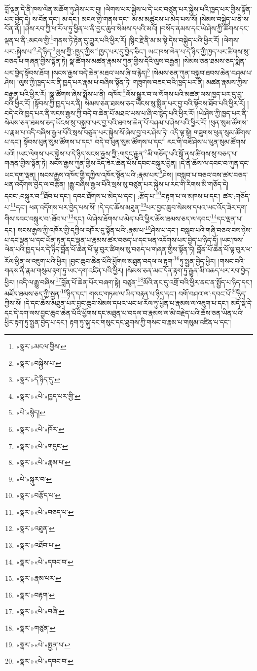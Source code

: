 བློ་ལྡན་དེ་ནི་ཁས་ལེན་མཆོག་ཏུ་ཤེས་པར་བྱ། །ལེགས་པར་སྐྱེས་པ་དེ་ཡང་བཙུན་པར་སྐྱེས་པའི་ཁྱད་པར་གྱིས་སྟོན་པར་བྱེད་དེ། ས་བོན་དང་། མ་དང་། མངལ་གྱི་གནས་དང་། མ་མ་མཚུངས་པ་མེད་པས་སོ། །སེམས་བསྐྱེད་པ་ནི་ས་བོན་ནོ། །ཤེས་རབ་ཀྱི་ཕ་རོལ་ཏུ་ཕྱིན་པ་ནི་བྱང་ཆུབ་སེམས་དཔའི་མའོ། །བསོད་ནམས་དང་ཡེ་ཤེས་ཀྱི་ཚོགས་དང་ལྡན་པ་ནི་:མངལ་གྱི་\footnote{«སྣར་»མངལ་གྱིས་}གནས་ཏེ་རྟེན་དུ་གྱུར་པའི་ཕྱིར་རོ། །སྙིང་རྗེ་ནི་མ་མ་སྟེ་དེས་བསྐྱེད་པའི་ཕྱིར་རོ། །ལེགས་པར་:སྐྱེས་པ་\footnote{«སྣར་»བསྐྱེས་པ་}:དེ་ཉིད་\footnote{«སྣར་»དེ་ཉིད་དུ་}ལུས་ཀྱི་:ཁྱད་ཀྱིས་\footnote{«སྣར་»«པེ་»ཁྱད་པར་གྱི་}ཁྱད་པར་དུ་བྱེད་ཅིང་། ཡང་ཁས་ལེན་པ་དེ་ཉིད་ཀྱི་ཁྱད་པར་ཚིགས་སུ་བཅད་པ་གཞན་གྱིས་སྟོན་ཏེ། སྣ་ཚོགས་མཚན་རྣམས་ཀུན་གྱིས་དེའི་ལུས་བརྒྱན། །སེམས་ཅན་ཐམས་ཅད་སྨིན་པར་བྱེད་སྟོབས་ཐོབ། །སངས་རྒྱས་བདེ་ཆེན་མཐའ་ཡས་ཞི་བ་རྙེད།\footnote{«པེ་»སྙེད།} །སེམས་ཅན་ཀུན་བསྐྱབ་ཐབས་ཆེན་བཤམ་པ་ཤེས། །ལུས་ཀྱི་ཁྱད་པར་ནི་ཁྱད་པར་རྣམ་པ་བཞིས་སྟོན་ཏེ། གཟུགས་བཟང་བའི་ཁྱད་པར་ནི། མཚན་རྣམས་ཀྱིས་བརྒྱན་པའི་ཕྱིར་རོ། །སྣ་ཚོགས་ཞེས་སྨོས་པ་ནི། འཁོར་\footnote{«སྣར་»«པེ་»ཁོར་}ལོས་སྒྱུར་བ་ལ་སོགས་པའི་མཚན་ལས་ཁྱད་པར་དུ་བྱ་བའི་ཕྱིར་རོ། །སྟོབས་ཀྱི་ཁྱད་པར་ནི། སེམས་ཅན་ཐམས་ཅད་ཡོངས་སུ་སྨིན་པར་བྱ་བའི་སྟོབས་ཐོབ་པའི་ཕྱིར་རོ། །བདེ་བའི་ཁྱད་པར་ནི་སངས་རྒྱས་ཀྱི་བདེ་བ་ཆེན་པོ་མཐའ་ཡས་པ་ཞི་བ་རྙེད་པའི་ཕྱིར་རོ། །ཡེ་ཤེས་ཀྱི་ཁྱད་པར་ནི་སེམས་ཅན་ཐམས་ཅད་ཡོངས་སུ་བསྐྱབ་པར་བྱ་བའི་ཐབས་ཆེན་པོ་བཤམ་པ་ཤེས་པའི་ཕྱིར་རོ། །ཕུན་སུམ་ཚོགས་པ་རྣམ་པ་འདི་བཞིས་རྒྱལ་པོའི་སྲས་བཙུན་པར་སྐྱེས་སོ་ཞེས་བྱ་བར་ཤེས་ཏེ། འདི་ལྟ་སྟེ། གཟུགས་ཕུན་སུམ་ཚོགས་པ་དང་། སྟོབས་ཕུན་སུམ་ཚོགས་པ་དང་། བདེ་བ་ཕུན་སུམ་ཚོགས་པ་དང་། རང་གི་བཟོ་ཤེས་པ་ཕུན་སུམ་ཚོགས་པའོ། །ཡང་ལེགས་པར་སྐྱེས་པ་དེ་ཉིད་སངས་རྒྱས་ཀྱི་:གདུང་རྒྱུན་\footnote{«སྣར་»«པེ་»གདུང་}མི་གཅོད་པའི་སྒོ་ནས་ཚིགས་སུ་བཅད་པ་གཞན་གྱིས་སྟོན་ཏེ། སངས་རྒྱས་ཀུན་གྱིས་འོད་ཟེར་ཆེན་པོས་དབང་བསྐུར་བྱིན། །དེ་ནི་ཆོས་ལ་དབང་བ་ཀུན་དང་ཡང་དག་ལྡན། །སངས་རྒྱས་འཁོར་གྱི་དཀྱིལ་འཁོར་སྟོན་པའི་:རྣམ་པར་\footnote{«སྣར་»«པེ་»རྣམ་པ་}ཤེས། །བསླབ་པ་བཅའ་བས་ཚར་བཅད་ཕན་འདོགས་བྱེད་ལ་བརྩོན། །རྒྱུ་བཞིས་རྒྱལ་པོའི་སྲས་སུ་བཙུན་པར་སྐྱེས་པ་རང་གི་རིགས་མི་གཅོད་དེ། དབང་:བསྐུར་བ་\footnote{«པེ་»སྐུར་བ་}ཐོབ་པ་དང་། དབང་ཐོགས་པ་མེད་པ་དང་། :རྩོད་པ་\footnote{«སྣར་»བརྩོད་པ་}བརྟག་པ་ལ་མཁས་པ་དང་། ཚར་:གཅོད་པ་\footnote{«སྣར་»«པེ་»བཅད་པ་}དང་། ཕན་འདོགས་པར་བྱེད་པས་སོ། །དེ་དང་ཆོས་མཐུན་\footnote{«སྣར་»འཐུན་}པར་བྱང་ཆུབ་སེམས་དཔའ་ཡང་འོད་ཟེར་དག་གིས་དབང་བསྐུར་བ་:ཐོབ་པ་\footnote{«སྣར་»འཐོབ་པ་}དང་། ཡེ་ཤེས་ཐོགས་པ་མེད་པའི་ཕྱིར་ཆོས་ཐམས་ཅད་ལ་དབང་\footnote{«སྣར་»«པེ་»དབང་བ་}དང་ལྡན་པ་དང་། སངས་རྒྱས་ཀྱི་འཁོར་གྱི་དཀྱིལ་འཁོར་དུ་སྟོན་པའི་:རྣམ་པ་\footnote{«སྣར་»རྣམ་པར་}ཤེས་པ་དང་། བསླབ་པའི་གཞི་བཅའ་བས་ཉེས་པ་དང་ལྡན་པ་དང་ཡོན་ཏན་དང་ལྡན་པ་རྣམས་ཚར་བཅད་པ་དང་ཕན་འདོགས་པར་བྱེད་པ་ཉིད་དོ། །ཡང་ཁས་ལེན་པའི་ཁྱད་པར་དེ་ཉིད་བློན་པོ་ཆེན་པོ་ལྟ་བུར་ཚིགས་སུ་བཅད་པ་གཞན་གྱིས་སྟོན་ཏེ། བློན་པོ་ཆེན་པོ་ལྟ་བུར་ཕ་རོལ་ཕྱིན་ལ་འཇུག་པའི་ཕྱིར། །བྱང་ཆུབ་ཆེན་པོའི་ཕྱོགས་མཐུན་བདལ་ལ་རྟག་\footnote{«སྣར་»བརྟག་}ཏུ་སྤྱན་བྱེད་ཕྱིར། །གསང་བའི་གནས་ནི་རྣམ་གསུམ་རྟག་ཏུ་ཡང་དག་འཛིན་པའི་ཕྱིར། །སེམས་ཅན་མང་དོན་རྟག་ཏུ་རྒྱུན་མི་འཆད་པར་རབ་བྱེད་ཕྱིར། །འདི་ལ་རྒྱུ་བཞིས་\footnote{«སྣར་»«པེ་»བཞི་}བློན་པོ་ཆེན་པོར་བཞག་སྟེ། བཙུན་\footnote{«སྣར་»གཙུན་}མོའི་ནང་དུ་འགྲོ་བའི་ཕྱིར་ནང་ན་སྤྱོད་པ་ཉིད་དང་། མཛོད་ཐམས་ཅད་ཀྱི་སྤྱན་\footnote{«སྣར་»«པེ་»སྤྱན་པ་}ཉིད་དང་། གསང་གཏམ་ལ་ཡིད་བརྟན་པ་ཉིད་དང་། བགོ་བཤའ་ལ་:དབང་པོ་\footnote{«སྣར་»«པེ་»དབང་བ་}ཉིད་ཀྱིས་སོ། །དེ་དང་ཆོས་མཐུན་པར་བྱང་ཆུབ་སེམས་དཔའ་ཡང་ཕ་རོལ་ཏུ་ཕྱིན་པ་རྣམས་ལ་འཇུག་པ་དང་། མདོ་སྡེ་དེ་དང་དེ་དག་ལས་བྱང་ཆུབ་ཆེན་པོའི་ཕྱོགས་དང་མཐུན་པ་བདལ་བ་རྣམས་ལ་མི་བརྗེད་པའི་ཆོས་ཅན་ཡིན་པའི་ཕྱིར་རྟག་ཏུ་སྤྱན་བྱེད་པ་དང་། རྟག་ཏུ་སྐུ་དང་གསུང་དང་ཐུགས་ཀྱི་གསང་བ་རྣམ་པ་གསུམ་འཛིན་པ་དང་། 
